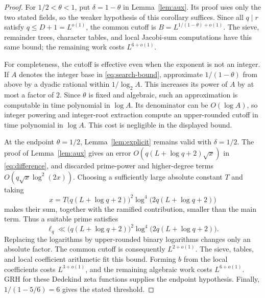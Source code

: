 \documentclass[11pt]{article}
\theoremstyle{definition}
\theoremstyle{remark}
\begin{document}
\begin{proof}
For $1/2<\theta<1$, put $\delta=1-\theta$ in
Lemma~\ref{lem:aux}. Its proof uses only the two stated fields,
so the weaker hypothesis of this corollary suffices. Since all
$q\mid r$ satisfy $q\le D+1=L^{o(1)}$, the common cutoff is
$B=L^{1/(1-\theta)+o(1)}$. The sieve, remainder trees, character
tables, and local Jacobi-sum computations have this same bound; the
remaining work costs $L^{6+o(1)}$.

For completeness, the cutoff is effective even when the exponent
is not an integer. If $A$ denotes the integer base in
\eqref{eq:search-bound}, approximate $1/(1-\theta)$ from above by
a dyadic rational within $1/\log_2 A$. This increases its power
of $A$ by at most a factor of $2$. Since $\theta$ is fixed and
algebraic, such an approximation is computable in time polynomial
in $\log A$. Its denominator can be $O(\log A)$, so integer
powering and integer-root extraction compute an upper-rounded
cutoff in time polynomial in $\log A$. This cost is negligible
in the displayed bound.

At the endpoint $\theta=1/2$, Lemma~\ref{lem:explicit} remains
valid with $\delta=1/2$. The proof of Lemma~\ref{lem:aux} gives
an error $O(q(L+\log q+2)\sqrt{x})$ in
\eqref{eq:difference}, and discarded prime-power and higher-degree
terms $O(q\sqrt{x}\log^2(2x))$. Choosing a sufficiently large
absolute constant $T$ and taking
\[
 x=T\bigl(q(L+\log q+2)\bigr)^2
       \log^4\!\bigl(2q(L+\log q+2)\bigr)
\]
makes their sum, together with the ramified contribution, smaller
than the main term. Thus a suitable prime satisfies
\[
 \ell_q\ll\bigl(q(L+\log q+2)\bigr)^2
       \log^4\!\bigl(2q(L+\log q+2)\bigr).
\]
Replacing the logarithms by upper-rounded binary logarithms changes
only an absolute factor. The common cutoff is consequently
$L^{2+o(1)}$. The sieve, tables, and local coefficient arithmetic
fit this bound. Forming $b$ from the local coefficients costs
$L^{3+o(1)}$, and the remaining algebraic work costs $L^{6+o(1)}$.
GRH for these Dedekind zeta functions supplies the endpoint
hypothesis. Finally,
$1/(1-5/6)=6$ gives the stated threshold.
\end{proof}
\end{document}
